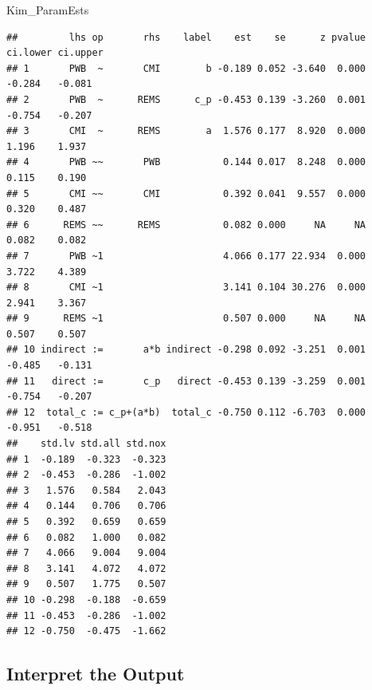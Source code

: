 \documentclass[
  11pt,
]{book}
\newenvironment{Shaded}{\begin{snugshade}}{\end{snugshade}}
\newcommand{\NormalTok}[1]{#1}
\begin{document}
\begin{Shaded}
\begin{Highlighting}[]
\NormalTok{Kim\_ParamEsts}
\end{Highlighting}
\end{Shaded}

\begin{verbatim}
##         lhs op       rhs    label    est    se      z pvalue ci.lower ci.upper
## 1       PWB  ~       CMI        b -0.189 0.052 -3.640  0.000   -0.284   -0.081
## 2       PWB  ~      REMS      c_p -0.453 0.139 -3.260  0.001   -0.754   -0.207
## 3       CMI  ~      REMS        a  1.576 0.177  8.920  0.000    1.196    1.937
## 4       PWB ~~       PWB           0.144 0.017  8.248  0.000    0.115    0.190
## 5       CMI ~~       CMI           0.392 0.041  9.557  0.000    0.320    0.487
## 6      REMS ~~      REMS           0.082 0.000     NA     NA    0.082    0.082
## 7       PWB ~1                     4.066 0.177 22.934  0.000    3.722    4.389
## 8       CMI ~1                     3.141 0.104 30.276  0.000    2.941    3.367
## 9      REMS ~1                     0.507 0.000     NA     NA    0.507    0.507
## 10 indirect :=       a*b indirect -0.298 0.092 -3.251  0.001   -0.485   -0.131
## 11   direct :=       c_p   direct -0.453 0.139 -3.259  0.001   -0.754   -0.207
## 12  total_c := c_p+(a*b)  total_c -0.750 0.112 -6.703  0.000   -0.951   -0.518
##    std.lv std.all std.nox
## 1  -0.189  -0.323  -0.323
## 2  -0.453  -0.286  -1.002
## 3   1.576   0.584   2.043
## 4   0.144   0.706   0.706
## 5   0.392   0.659   0.659
## 6   0.082   1.000   0.082
## 7   4.066   9.004   9.004
## 8   3.141   4.072   4.072
## 9   0.507   1.775   0.507
## 10 -0.298  -0.188  -0.659
## 11 -0.453  -0.286  -1.002
## 12 -0.750  -0.475  -1.662
\end{verbatim}

\hypertarget{interpret-the-output-1}{%
\subsection{Interpret the Output}\label{interpret-the-output-1}}
\end{document}
